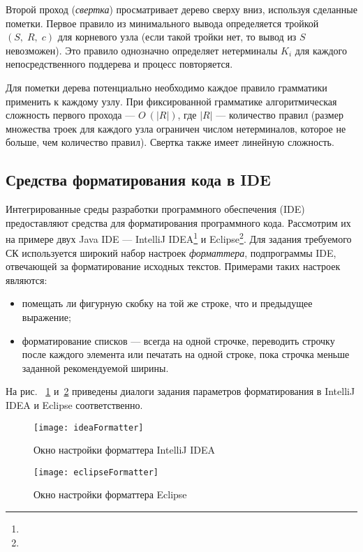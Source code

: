 Второй проход (\emph{свертка}) просматривает дерево сверху вниз, используя сделанные пометки.
Первое правило из минимального вывода определяется тройкой $(S,\;R,\;c)$ для корневого узла
(если такой тройки нет, то вывод из $S$ невозможен).
Это правило однозначно определяет нетерминалы $K_i$ для каждого непосредственного поддерева
и процесс повторяется.

Для пометки дерева потенциально необходимо каждое правило грамматики применить к каждому узлу.
При фиксированной грамматике алгоритмическая сложность первого прохода --- $O\:(|R|)$,
где $|R|$ --- количество правил
(размер множества троек для каждого узла ограничен числом нетерминалов, которое не больше,
чем количество правил). Свертка также имеет линейную сложность.


\subsection{Средства форматирования кода в IDE}

Интегрированные среды разработки программного обеспечения
(IDE) предоставляют средства
для форматирования программного кода. Рассмотрим их на примере двух Java IDE ---
IntelliJ IDEA\footnote{} и
Eclipse\footnote{}.
Для задания требуемого СК используется широкий набор настроек \emph{форматтера},
подпрограммы IDE, отвечающей за форматирование исходных текстов.
Примерами таких настроек являются:
\begin{itemize}
  \item помещать ли фигурную скобку на той же строке, что и
    предыдущее выражение;
  \item форматирование списков --- всегда на одной строчке, переводить строчку после
    каждого элемента или печатать на одной строке,
    пока строчка меньше заданной рекомендуемой ширины.
\end{itemize}
На рис. ~\ref{fig:ideaFormatter} и~\ref{fig:eclipseFormatter} приведены диалоги задания
параметров форматирования в IntelliJ IDEA и Eclipse соответственно.

\begin{figure}[p]
	\centering
	\texttt{[image: ideaFormatter]}
	\caption{Окно настройки форматтера IntelliJ IDEA}
	\label{fig:ideaFormatter}
\end{figure}

\begin{figure}[p]
	\centering
	\texttt{[image: eclipseFormatter]}
	\caption{Окно настройки форматтера Eclipse}
	\label{fig:eclipseFormatter}
\end{figure}

